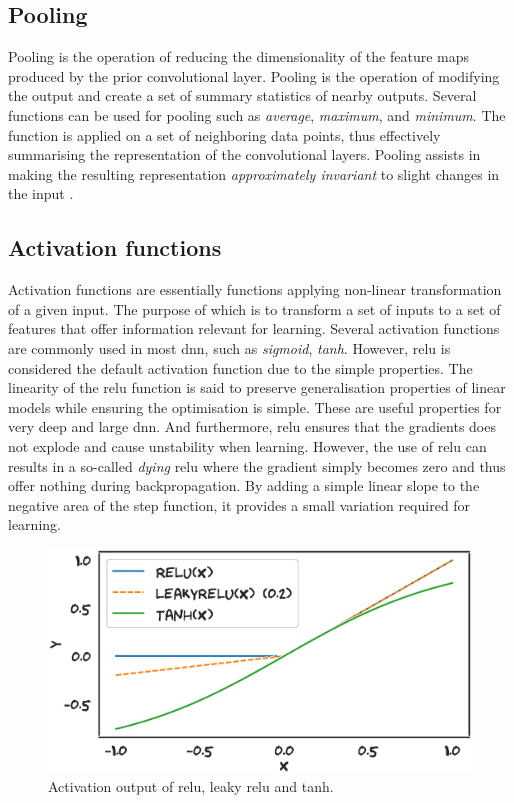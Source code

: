 \subsection{Pooling}
Pooling is the operation of reducing the dimensionality of the feature maps produced by the prior convolutional layer. Pooling is the operation of modifying the output and create a set of summary statistics of nearby outputs. Several functions can be used for pooling such as \emph{average}, \emph{maximum}, and \emph{minimum}. The function is applied on a set of neighboring data points, thus effectively summarising the representation of the convolutional layers. Pooling assists in making the resulting representation \emph{approximately invariant} to slight changes in the input \cite{Goodfellow-et-al-2016}.


\subsection{Activation functions}
Activation functions are essentially functions applying non-linear transformation of a given input. The purpose of which is to transform a set of inputs to a set of features that offer information relevant for learning. Several activation functions are commonly used in most \gls{dnn}, such as \emph{sigmoid}, \emph{tanh}. However, \gls{relu} is considered the default activation function due to the simple properties. The linearity of the \gls{relu} function is said to preserve generalisation properties of linear models while ensuring the optimisation is simple. These are useful properties for very deep and large \gls{dnn}. And furthermore, \gls{relu} ensures that the gradients does not explode and cause unstability when learning. However, the use of \gls{relu} can results in a so-called \emph{dying} \gls{relu} where the gradient simply becomes zero and thus offer nothing during backpropagation. By adding a simple linear slope to the negative area of the step function, it provides a small variation required for learning.

\begin{figure}
    \centering
    \includegraphics[width=\textwidth]{chapters/figures/relu_leakyrelu_example.eps}
    \caption{Activation output of \gls{relu}, leaky \gls{relu} and tanh.}
    \label{fig:my_label}
\end{figure}


